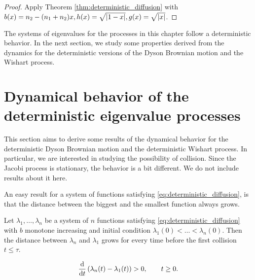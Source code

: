 \begin{proof}
    Apply Theorem \ref{thm:deterministic_diffusion} with $b(x) = n_2 - (n_1+n_2)x, h(x) = \sqrt{\lvert 1-x \rvert}, g(x)=\sqrt{\lvert x \rvert}$. 
\end{proof}

The systems of eigenvalues for the processes in this chapter follow a deterministic behavior. In the next section, we study some properties derived from the dynamics for the deterministic versions of the Dyson Brownian motion and the Wishart process.

\section{Dynamical behavior of the deterministic eigenvalue processes}

This section aims to derive some results of the dynamical behavior for the deterministic Dyson Brownian motion and the deterministic Wishart process. In particular, we are interested in studying the possibility of collision. Since the Jacobi process is stationary, the behavior is a bit different. We do not include results about it here.

An easy result for a system of functions satisfying \eqref{eq:deterministic_diffusion}, is that the distance between the biggest and the smallest function always grows.


\begin{proposition}
     Let $\lambda_1, \dots, \lambda_n$ be a system of $n$ functions satisfying \eqref{eq:deterministic_diffusion} with $b$ monotone increasing and initial condition $\lambda_1(0) < \dots < \lambda_n(0)$. Then the distance between $\lambda_n$ and $\lambda_1$ grows for every time before the first collision $t\le \tau$.

     \begin{equation*}
         \frac{\mathrm d}{\mathrm d t}\left( \lambda_n(t) - \lambda_1(t) \right) > 0, \qquad t \ge 0.
     \end{equation*}
\end{proposition}


